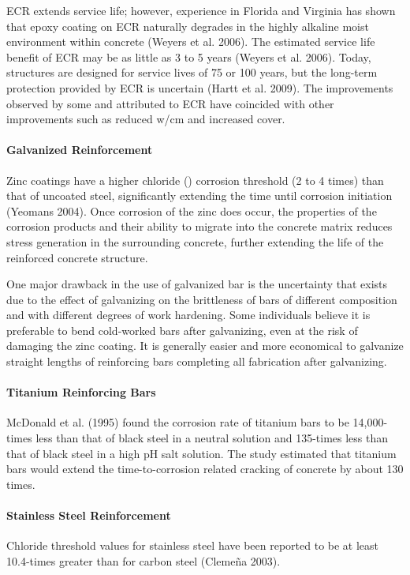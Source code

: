 ECR extends service life; however, experience in Florida and Virginia has shown that epoxy coating on ECR naturally degrades in the highly alkaline moist environment within concrete (Weyers et al. 2006). The estimated service life benefit of ECR may be as little as 3 to 5 years (Weyers et al. 2006). Today, structures are designed for service lives of 75 or 100 years, but the long-term protection provided by ECR is uncertain (Hartt et al. 2009). The improvements observed by some and attributed to ECR have coincided with other improvements such as reduced w/cm and increased cover.

\paragraph{Galvanized Reinforcement}
Zinc coatings have a higher chloride () corrosion threshold (2 to 4 times) than that of uncoated steel, significantly extending the time until corrosion initiation (Yeomans 2004). Once corrosion of the zinc does occur,
the properties of the corrosion products and their ability to migrate into the concrete matrix reduces stress generation in the surrounding concrete, further extending the life of the reinforced concrete structure.

One major drawback in the use of galvanized bar is the uncertainty that exists due to the effect of galvanizing on the brittleness of bars of different composition and with different degrees of work hardening. Some individuals believe it is preferable to bend cold-worked bars after galvanizing, even at the risk of damaging the zinc coating. It is generally easier and more economical to galvanize straight lengths of reinforcing bars completing all fabrication after galvanizing.

\paragraph{Titanium Reinforcing Bars}
McDonald et al. (1995) found the corrosion rate of titanium bars to be 14,000-times less than that of black steel in a neutral solution and 135-times less than that of black steel in a high pH salt solution. The study estimated that titanium bars would extend the time-to-corrosion related cracking of concrete by about 130 times.

\paragraph{Stainless Steel Reinforcement}
Chloride threshold values for stainless steel have been reported to be at least 10.4-times greater than for carbon steel (Cleme\~{n}a 2003).

